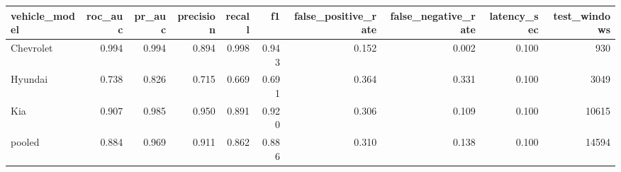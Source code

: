 \begin{tabular}{lrrrrrrrrr}
\toprule
vehicle_model & roc_auc & pr_auc & precision & recall & f1 & false_positive_rate & false_negative_rate & latency_sec & test_windows \\
\midrule
Chevrolet & 0.994 & 0.994 & 0.894 & 0.998 & 0.943 & 0.152 & 0.002 & 0.100 & 930 \\
Hyundai & 0.738 & 0.826 & 0.715 & 0.669 & 0.691 & 0.364 & 0.331 & 0.100 & 3049 \\
Kia & 0.907 & 0.985 & 0.950 & 0.891 & 0.920 & 0.306 & 0.109 & 0.100 & 10615 \\
pooled & 0.884 & 0.969 & 0.911 & 0.862 & 0.886 & 0.310 & 0.138 & 0.100 & 14594 \\
\bottomrule
\end{tabular}
